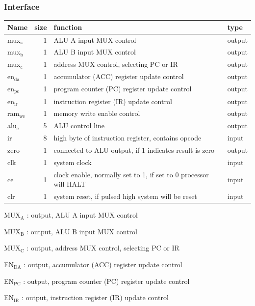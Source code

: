 \documentclass[11pt]{article}
\begin{document}
\subsubsection{Interface}
\label{sec:orgb9093a0}
\begin{center}
\begin{tabular}{lrll}
Name & size & function & type\\
\hline
mux\(_{\text{a}}\) & 1 & ALU A input MUX control & output\\
mux\(_{\text{b}}\) & 1 & ALU B input MUX control & output\\
mux\(_{\text{c}}\) & 1 & address MUX control, selecting PC or IR & output\\
en\(_{\text{da}}\) & 1 & accumulator (ACC) register update control & output\\
en\(_{\text{pc}}\) & 1 & program counter (PC) register update control & output\\
en\(_{\text{ir}}\) & 1 & instruction register (IR) update control & output\\
ram\(_{\text{we}}\) & 1 & memory write enable control & output\\
alu\(_{\text{c}}\) & 5 & ALU control line & output\\
ir & 8 & high byte of instruction register, contains opcode & input\\
zero & 1 & connected to ALU output, if 1 indicates result is zero & output\\
clk & 1 & system clock & input\\
ce & 1 & clock enable, normally set to 1, if set to 0 processor will HALT & input\\
clr & 1 & system reset, if pulsed high system will be reset & input\\
\hline
\end{tabular}
\end{center}


MUX\(_{\text{A}}\) : output, ALU A input MUX control

MUX\(_{\text{B}}\) : output, ALU B input MUX control 

MUX\(_{\text{C}}\) : output, address MUX control, selecting PC or IR 

EN\(_{\text{DA}}\) : output, accumulator (ACC) register update control 

EN\(_{\text{PC}}\) : output, program counter (PC) register update control 

EN\(_{\text{IR}}\) : output, instruction register (IR) update control 
\end{document}
